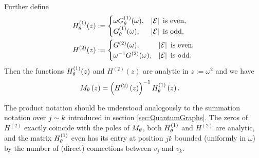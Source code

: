 \begin{cory}
\begin{align*}
	\end{align*}
	Further define
	\begin{align*}
		H^{(1)}_{\theta}(z) &:= 
		\begin{cases} 
			\omega G_\theta^{(1)}(\omega), & \left\lvert \mathcal{E} \right\rvert \text{ is even}, \\
			G_\theta^{(1)}(\omega), & \left\lvert \mathcal{E} \right\rvert \text{ is odd},
		\end{cases} \\
		H^{(2)}(z) &:=
		\begin{cases}
			G^{(2)}(\omega), & \left\lvert \mathcal{E} \right\rvert \text{ is even}, \\
			\omega^{-1} G^{(2)}(\omega), & \left\lvert \mathcal{E} \right\rvert \text{ is odd}.
		\end{cases}
	\end{align*}
	Then the functions $H^{(1)}_{\theta}(z)$ and $H^{(2)}(z)$ are analytic in $z:=\omega^2$ and we have
	\begin{align*}
		M_\theta\left( z \right) &= \left(  H^{(2)}\left( z \right)  \right)^{-1} H^{(1)}_\theta\left( z \right).
	\end{align*}
\end{cory}
The product notation should be understood analogously to the summation notation over $j\sim k$ introduced in section \ref{sec:QuantumGraphs}.
The zeros of $H^{(2)}$ exactly coincide with the poles of $M_\theta$, both $H^{(1)}_\theta$ and $H^{(2)}$ are analytic, and the matrix $H^{(1)}_\theta$ even has its entry at position $jk$ bounded (uniformly in $\omega$) by the number of (direct) connections between $v_j$ and $v_k$.

